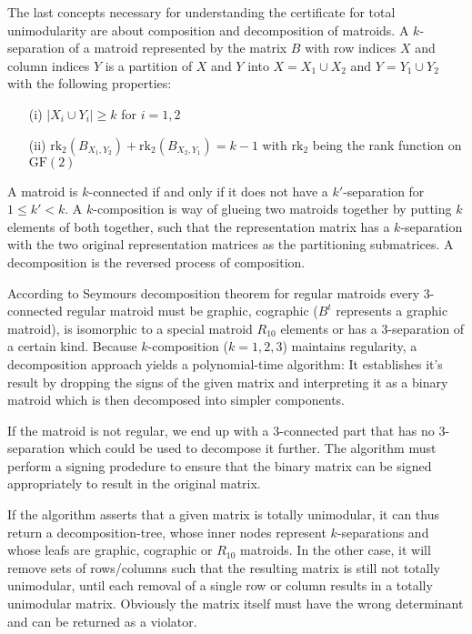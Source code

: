 \documentclass[12pt]{article}
\begin{document}
The last concepts necessary for understanding the certificate for total unimodularity are about
composition and decomposition of matroids. A $k$-separation of a matroid
represented by the matrix $B$ with row indices $X$ and column indices $Y$ is a partition
of $X$ and $Y$ into $X = X_1 \cup X_2$ and $Y = Y_1 \cup Y_2$ with the following properties:
\begin{enumerate}
\item[(i)]
  $|X_i \cup Y_i| \geq k$ for $i = 1,2$
\item[(ii)]
  $\mathrm{rk}_2 (B_{X_1, Y_2}) + \mathrm{rk}_2 (B_{X_2, Y_1}) = k-1$ with $\mathrm{rk}_2$ being the rank function on $\mathrm{GF}(2)$
\end{enumerate}
A matroid is $k$-connected if and only if it does not have a $k'$-separation for $1 \leq k' < k$. A $k$-composition
is way of glueing two matroids together by putting $k$ elements of both together, such that the
representation matrix has a $k$-separation with the two original representation matrices
as the partitioning submatrices. A decomposition is the reversed process of composition.

According to Seymours decomposition theorem for regular matroids every 3-connected
regular matroid must be graphic, cographic ($B^t$ represents a graphic matroid), is isomorphic to a special matroid $R_{10}$
elements or has a 3-separation of a certain kind. Because $k$-composition ($k=1,2,3$) maintains
regularity, a decomposition approach yields a polynomial-time algorithm:
It establishes it's result by dropping the signs of the given matrix
and interpreting it as a binary matroid which is then decomposed into simpler components.

If the matroid is not regular, we end up with a 3-connected part that has no $3$-separation
which could be used to decompose it further. The algorithm must perform a signing prodedure to ensure that
the binary matrix can be signed appropriately to result in the original matrix.

If the algorithm asserts that a given matrix is totally unimodular, it can thus return a decomposition-tree,
whose inner nodes represent $k$-separations and whose leafs are graphic, cographic or $R_{10}$ matroids. In the other case,
it will remove sets of rows/columns such that the resulting matrix is still not totally unimodular, 
until each removal of a single row or column results in a totally unimodular matrix. Obviously the matrix itself must have
the wrong determinant and can be returned as a violator.
\end{document}
